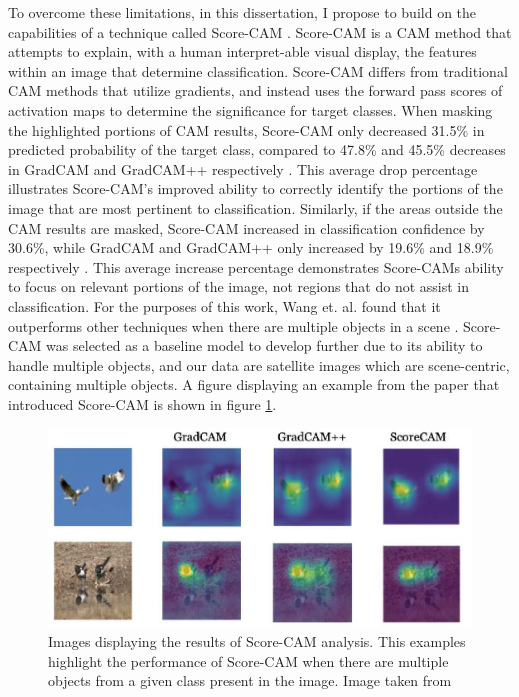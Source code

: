 To overcome these limitations, in this dissertation, I propose to build on the capabilities of a technique called Score-CAM \citep{wang2020score}.  Score-CAM is a CAM method that attempts to explain, with a human interpret-able visual display, the features within an image that determine classification.  Score-CAM differs from traditional CAM methods that utilize gradients, and instead uses the forward pass scores of activation maps to determine the significance for target classes\citep{wang2020score}.  When masking the highlighted portions of CAM results, Score-CAM only decreased 31.5\% in predicted probability of the target class, compared to 47.8\% and 45.5\% decreases in GradCAM and GradCAM++ respectively \citep{wang2020score}.  This average drop percentage illustrates Score-CAM's improved ability to correctly identify the portions of the image that are most pertinent to classification.  Similarly, if the areas outside the CAM results are masked, Score-CAM increased in classification confidence by 30.6\%, while GradCAM and GradCAM++ only increased by 19.6\% and 18.9\% respectively \citep{wang2020score}.  This average increase percentage demonstrates Score-CAMs ability to focus on relevant portions of the image, not regions that do not assist in classification. For the purposes of this work, Wang et. al. found that it outperforms other techniques when there are multiple objects in a scene \citep{wang2020score}.  Score-CAM was selected as a baseline model to develop further due to its ability to handle multiple objects, and our data are satellite images which are scene-centric, containing multiple objects.  A figure displaying an example from the paper that introduced Score-CAM is shown in figure \ref{fig:scorecam_introduced}.

\begin{figure}
    \centering
    \includegraphics[width=0.5\linewidth]{Figures/scorecam_introduced_example.png}
    \caption{Images displaying the results of Score-CAM analysis.  This examples highlight the performance of Score-CAM when there are multiple objects from a given class present in the image.  Image taken from \citep{wang2020score}}
    \label{fig:scorecam_introduced}
\end{figure}








